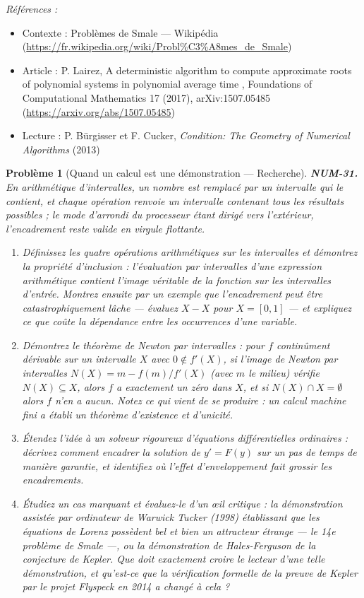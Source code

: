 \documentclass[11pt]{article}
\newtheorem{problem}{Problème}
\newenvironment{refs}{\par\small\noindent\emph{Références :}\begin{itemize}\setlength\itemsep{0pt}}{\end{itemize}\normalsize}
\begin{document}
\begin{refs}
\item Contexte : Problèmes de Smale --- Wikipédia (\url{https://fr.wikipedia.org/wiki/Probl%C3%A8mes_de_Smale})
\item Article : P. Lairez, \og{} A deterministic algorithm to compute approximate roots of polynomial systems in polynomial average time \fg{}, Foundations of Computational Mathematics 17 (2017), arXiv:1507.05485 (\url{https://arxiv.org/abs/1507.05485})
\item Lecture : P. Bürgisser et F. Cucker, \textit{Condition: The Geometry of Numerical Algorithms} (2013)
\end{refs}

\bigskip

\begin{problem}[{Quand un calcul est une démonstration --- Recherche}]
\textbf{NUM-31.} En arithmétique d'intervalles, un nombre est remplacé par un intervalle qui le contient, et chaque opération renvoie un intervalle contenant tous les résultats possibles ; le mode d'arrondi du processeur étant dirigé vers l'extérieur, l'encadrement reste valide en virgule flottante.
\begin{enumerate}
\item[(a)] Définissez les quatre opérations arithmétiques sur les intervalles et démontrez la propriété d'inclusion : l'évaluation par intervalles d'une expression arithmétique contient l'image véritable de la fonction sur les intervalles d'entrée. Montrez ensuite par un exemple que l'encadrement peut être catastrophiquement lâche --- évaluez $X - X$ pour $X = [0,1]$ --- et expliquez ce que coûte la dépendance entre les occurrences d'une variable.
\item[(b)] Démontrez le théorème de Newton par intervalles : pour $f$ continûment dérivable sur un intervalle $X$ avec $0 \notin f'(X)$, si l'image de Newton par intervalles $N(X) = m - f(m)/f'(X)$ (avec $m$ le milieu) vérifie $N(X) \subseteq X$, alors $f$ a exactement un zéro dans $X$, et si $N(X) \cap X = \emptyset$ alors $f$ n'en a aucun. Notez ce qui vient de se produire : un calcul machine fini a établi un théorème d'existence et d'unicité.
\item[(c)] Étendez l'idée à un solveur rigoureux d'équations différentielles ordinaires : décrivez comment encadrer la solution de $y' = F(y)$ sur un pas de temps de manière garantie, et identifiez où l'effet d'enveloppement fait grossir les encadrements.
\item[(d)] Étudiez un cas marquant et évaluez-le d'un \oe{}il critique : la démonstration assistée par ordinateur de Warwick Tucker (1998) établissant que les équations de Lorenz possèdent bel et bien un attracteur étrange --- le 14e problème de Smale ---, ou la démonstration de Hales-Ferguson de la conjecture de Kepler. Que doit exactement croire le lecteur d'une telle démonstration, et qu'est-ce que la vérification formelle de la preuve de Kepler par le projet Flyspeck en 2014 a changé à cela ?
\end{enumerate}

\end{problem}
\end{document}
